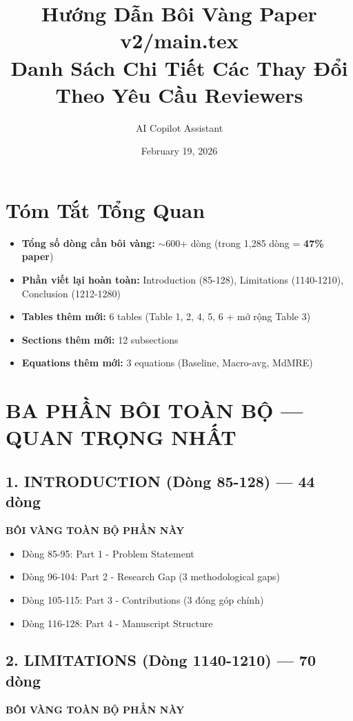 \documentclass[11pt,a4paper]{article}
\title{\textbf{Hướng Dẫn Bôi Vàng Paper v2/main.tex}\\[0.5em]
\large Danh Sách Chi Tiết Các Thay Đổi Theo Yêu Cầu Reviewers}
\author{AI Copilot Assistant}
\date{February 19, 2026}
\begin{document}
\maketitle

\section*{Tóm Tắt Tổng Quan}

\begin{itemize}
    \item \textbf{Tổng số dòng cần bôi vàng:} $\sim$600+ dòng (trong 1,285 dòng = \textbf{47\% paper})
    \item \textbf{Phần viết lại hoàn toàn:} Introduction (85-128), Limitations (1140-1210), Conclusion (1212-1280)
    \item \textbf{Tables thêm mới:} 6 tables (Table 1, 2, 4, 5, 6 + mở rộng Table 3)
    \item \textbf{Sections thêm mới:} 12 subsections
    \item \textbf{Equations thêm mới:} 3 equations (Baseline, Macro-avg, MdMRE)
\end{itemize}

\vspace{1em}
\noindent{}

\section{BA PHẦN BÔI TOÀN BỘ --- QUAN TRỌNG NHẤT}

\subsection{1. INTRODUCTION (Dòng 85-128) --- 44 dòng}
\textbf{BÔI VÀNG TOÀN BỘ PHẦN NÀY}

\begin{itemize}
    \item Dòng 85-95: Part 1 - Problem Statement
    \item Dòng 96-104: Part 2 - Research Gap (3 methodological gaps)
    \item Dòng 105-115: Part 3 - Contributions (3 đóng góp chính)
    \item Dòng 116-128: Part 4 - Manuscript Structure
\end{itemize}

\subsection{2. LIMITATIONS (Dòng 1140-1210) --- 70 dòng}
\textbf{BÔI VÀNG TOÀN BỘ PHẦN NÀY}
\end{document}
